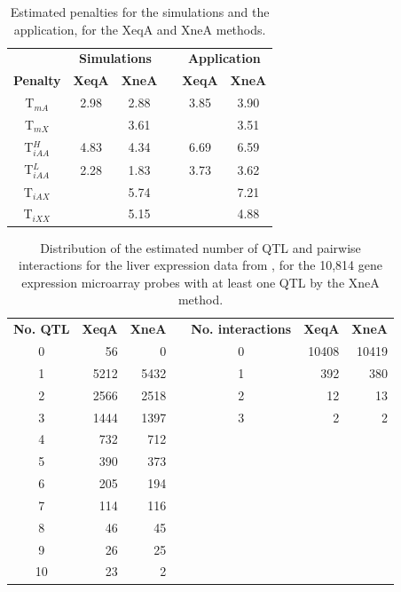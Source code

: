 \documentclass[12pt,letterpaper]{article}
\begin{document}
\begin{table}
\begin{center}
  \caption{Estimated penalties for the simulations and the
    application, for the XeqA and XneA methods.\label{tab:penalties}}

  \begin{tabular}{cccccc} \hline
             & \multicolumn{2}{c}{\textbf{Simulations}} &\quad&
    \multicolumn{2}{c}{\textbf{Application}} \\ \cline{2-3} \cline{5-6}
    \textbf{Penalty} & \textbf{XeqA} & \textbf{XneA} && \textbf{XeqA}
    & \textbf{XneA} \\ \hline
    T$_{mA}$    & 2.98 & 2.88 && 3.85 & 3.90 \\
    T$_{mX}$    &      & 3.61 &&      & 3.51 \\
    T$_{iAA}^H$ & 4.83 & 4.34 && 6.69 & 6.59 \\
    T$_{iAA}^L$ & 2.28 & 1.83 && 3.73 & 3.62 \\
    T$_{iAX}$   &      & 5.74 &&      & 7.21 \\
    T$_{iXX}$   &      & 5.15 &&      & 4.88 \\ \hline
  \end{tabular}
\end{center}
\end{table}



\clearpage

\begin{table}
\begin{center}
  \caption{Distribution of the estimated number of QTL and pairwise interactions for the
    liver expression data from \citet{Tian2016}, for the 10,814 gene
    expression microarray probes with at least one QTL by the XneA
    method.\label{tab:num_qtl}}

  \begin{tabular}{crrccrr}
    \cline{1-3}\cline{5-7}
    \textbf{No. QTL} & \textbf{XeqA} & \textbf{XneA} & \qquad\qquad &
    \textbf{No. interactions} & \textbf{XeqA} & \textbf{XneA} \\
    \cline{1-3}\cline{5-7}
    0 &   56 &    0 && 0 & 10408 & 10419 \\
    1 & 5212 & 5432 && 1 &   392 &   380 \\
    2 & 2566 & 2518 && 2 &    12 &    13 \\
    3 & 1444 & 1397 && 3 &     2 &     2 \\ \cline{5-7}
    4 &  732 &  712 &\\
    5 &  390 &  373 &\\
    6 &  205 &  194 &\\
    7 &  114 &  116 &\\
    8 &   46 &   45 &\\
    9 &   26 &   25 &\\
   10 &   23 &    2 &\\ \cline{1-3}
  \end{tabular}
\end{center}
  \end{table}
\end{document}
